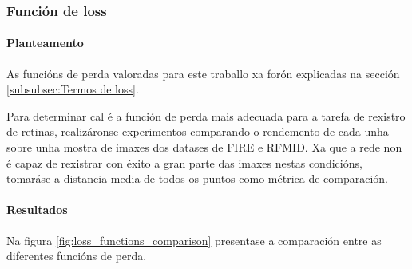\FloatBarrier

\subsubsection{Función de loss}
\label{subsubsec:Función de loss}

\paragraph{Planteamento}
\label{par:Planteamento-loss}

As funcións de perda valoradas para este traballo xa forón explicadas na sección \ref{subsubsec:Termos de loss}.

Para determinar cal é a función de perda mais adecuada para a tarefa de rexistro de retinas, realizáronse experimentos comparando o rendemento de cada unha sobre unha mostra de imaxes dos datases de FIRE e RFMID.
Xa que a rede non é capaz de rexistrar con éxito a gran parte das imaxes nestas condicións, tomaráse a distancia media de todos os puntos como métrica de comparación.

\paragraph{Resultados}
\label{par:Resultados-loss}

Na figura \ref{fig:loss_functions_comparison} presentase a comparación entre as diferentes funcións de perda.





